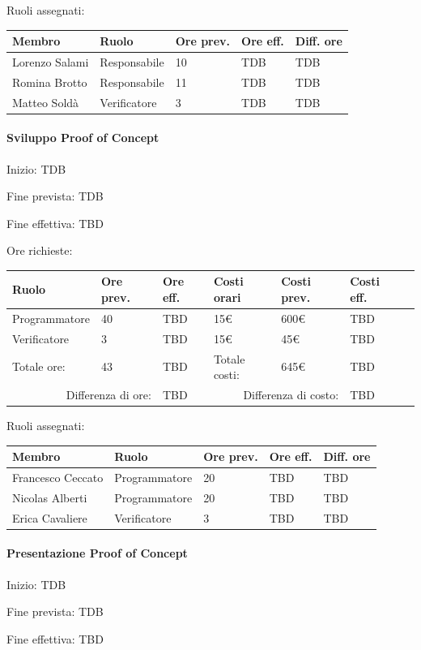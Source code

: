 \documentclass[a4paper, 12pt]{article}
\begin{document}
Ruoli assegnati:\\[0.5em]
\begin{tabular}{|l|l|l|l|l|}\hline
Membro & Ruolo & Ore prev. & Ore eff. & Diff. ore \\\hline
Lorenzo Salami & Responsabile & 10 & TDB & TDB \\\hline
Romina Brotto & Responsabile & 11 & TDB & TDB \\\hline
Matteo Soldà & Verificatore & 3 & TDB & TDB \\\hline
\end{tabular}

\paragraph{Sviluppo Proof of Concept}
Inizio: TDB\par
Fine prevista: TDB\par
Fine effettiva: TBD

Ore richieste:\\[0.5em]
\begin{tabular}{|l|l|l||l|l|l|l|}\hline
Ruolo & Ore prev. & Ore eff. & Costi orari & Costi prev. & Costi eff.\\\hline
Programmatore & 40 & TBD & 15\euro & 600\euro & TBD \\\hline
Verificatore & 3 & TBD & 15\euro & 45\euro & TBD \\\hline
Totale ore: & 43 & TBD & Totale costi: & 645\euro & TBD \\\hline
\multicolumn{2}{|r|}{Differenza di ore:} & TBD & \multicolumn{2}{r|}{Differenza di costo:} & TBD \\\hline
\end{tabular}

Ruoli assegnati:\\[0.5em]
\begin{tabular}{|l|l|l|l|l|}\hline
Membro & Ruolo & Ore prev. & Ore eff. & Diff. ore \\\hline
Francesco Ceccato & Programmatore & 20 & TBD & TBD \\\hline
Nicolas Alberti & Programmatore & 20 & TBD & TBD \\\hline
Erica Cavaliere & Verificatore  & 3 & TBD & TBD \\\hline
\end{tabular}

\paragraph{Presentazione Proof of Concept}
Inizio: TDB\par
Fine prevista: TDB\par
Fine effettiva: TBD
\end{document}
